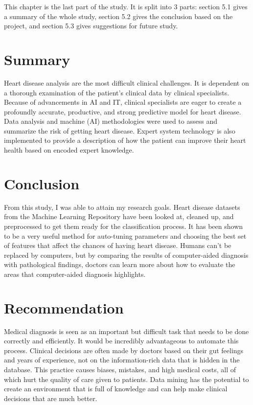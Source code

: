 \noindent
This chapter is the last part of the study. It is split into 3 parts: section 5.1 gives a summary of the whole study, section 5.2 gives the conclusion based on the project, and section 5.3 gives suggestions for future study.

\section{Summary}
Heart disease analysis are the most difficult clinical challenges. It is dependent on a thorough examination of the patient's clinical data by clinical specialists. Because of advancements in AI and IT, clinical specialists are eager to create a profoundly accurate, productive, and strong predictive model for heart disease. Data analysis and machine (AI) methodologies were used to assess and summarize the risk of getting heart disease. Expert system technology is also implemented to provide a description of how the patient can improve their heart health based on encoded expert knowledge.

\section{Conclusion}
From this study, I was able to attain my research goals. Heart disease datasets from the Machine Learning Repository have been looked at, cleaned up, and preprocessed to get them ready for the classification process. It has been shown to be a very useful method for auto-tuning parameters and choosing the best set of features that affect the chances of having heart disease. Humans can't be replaced by computers, but by comparing the results of computer-aided diagnosis with pathological findings, doctors can learn more about how to evaluate the areas that computer-aided diagnosis highlights.

\section{Recommendation}
Medical diagnosis is seen as an important but difficult task that needs to be done correctly and efficiently. It would be incredibly advantageous to automate this process. Clinical decisions are often made by doctors based on their gut feelings and years of experience, not on the information-rich data that is hidden in the database. This practice causes biases, mistakes, and high medical costs, all of which hurt the quality of care given to patients. Data mining has the potential to create an environment that is full of knowledge and can help make clinical decisions that are much better.
